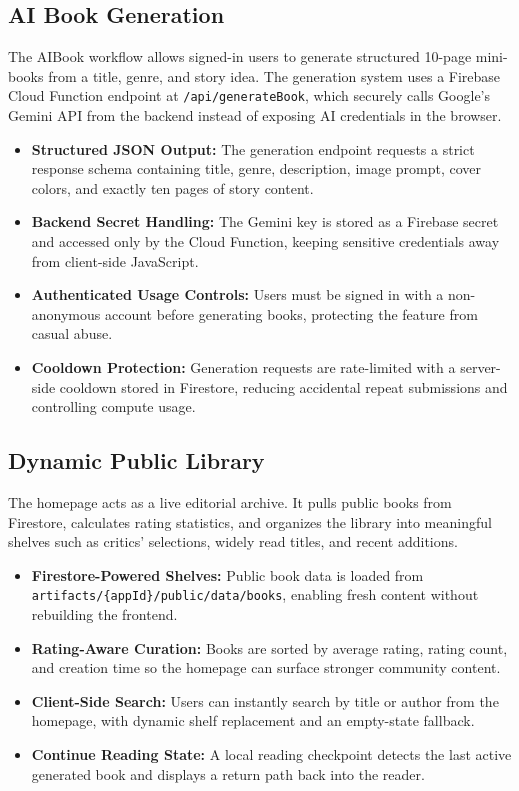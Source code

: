\documentclass[11pt, a4paper]{article}
\begin{document}
\subsection{AI Book Generation}
The AIBook workflow allows signed-in users to generate structured 10-page mini-books from a title, genre, and story idea. The generation system uses a Firebase Cloud Function endpoint at \texttt{/api/generateBook}, which securely calls Google's Gemini API from the backend instead of exposing AI credentials in the browser.

\begin{itemize}[label=\textcolor{abookigold}{\textbullet}]
    \item \textbf{Structured JSON Output:} The generation endpoint requests a strict response schema containing title, genre, description, image prompt, cover colors, and exactly ten pages of story content.
    \item \textbf{Backend Secret Handling:} The Gemini key is stored as a Firebase secret and accessed only by the Cloud Function, keeping sensitive credentials away from client-side JavaScript.
    \item \textbf{Authenticated Usage Controls:} Users must be signed in with a non-anonymous account before generating books, protecting the feature from casual abuse.
    \item \textbf{Cooldown Protection:} Generation requests are rate-limited with a server-side cooldown stored in Firestore, reducing accidental repeat submissions and controlling compute usage.
\end{itemize}

\subsection{Dynamic Public Library}
The homepage acts as a live editorial archive. It pulls public books from Firestore, calculates rating statistics, and organizes the library into meaningful shelves such as critics' selections, widely read titles, and recent additions.

\begin{itemize}[label=\textcolor{abookigold}{\textbullet}]
    \item \textbf{Firestore-Powered Shelves:} Public book data is loaded from \texttt{artifacts/\{appId\}/public/data/books}, enabling fresh content without rebuilding the frontend.
    \item \textbf{Rating-Aware Curation:} Books are sorted by average rating, rating count, and creation time so the homepage can surface stronger community content.
    \item \textbf{Client-Side Search:} Users can instantly search by title or author from the homepage, with dynamic shelf replacement and an empty-state fallback.
    \item \textbf{Continue Reading State:} A local reading checkpoint detects the last active generated book and displays a return path back into the reader.
\end{itemize}
\end{document}
